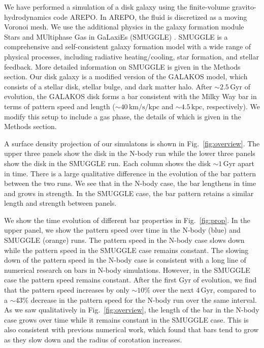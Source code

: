 \documentclass{natureprintstyle}
\begin{document}
We have performed a simulation of a disk galaxy using the finite-volume
gravito-hydrodynamics code AREPO.\cite{2010MNRAS.401..791S} In AREPO, the
fluid is discretized as a moving Voronoi mesh. We use the additional physics
in the galaxy formation module Stars and MUltiphase Gas in GaLaxiEs (SMUGGLE)
\cite{2019MNRAS.489.4233M}. SMUGGLE is a comprehensive and self-consistent
galaxy formation model with a wide range of physical processes, including
radiative heating/cooling, star formation, and stellar feedback. More detailed
information on SMUGGLE is given in the Methods section. Our disk galaxy is a
modified version of the GALAKOS model\cite{2020ApJ...890..117D}, which
consists of a stellar disk, stellar bulge, and dark matter halo. After
$\sim2.5\,\textrm{Gyr}$ of evolution, the GALAKOS disk forms a bar consistent
with the Milky Way bar in terms of pattern speed and length
($\sim40\,\textrm{km}/\textrm{s}/\textrm{kpc}$ and $\sim4.5\,\textrm{kpc}$,
respectively). We modify this setup to include a gas phase, the details of
which is given in the Methods section.

A surface density projection of our simulatons is shown in
Fig.~\ref{fig:overview}. The upper three panels show the disk in the N-body
run while the lower three panels show the disk in the SMUGGLE run. Each column
shows the disk $\sim1\,\textrm{Gyr}$ apart in time. There is a large qualitative
difference in the evolution of the bar pattern between the two runs. We see
that in the N-body case, the bar lengthens in time and grows in strength. In
the SMUGGLE case, the bar pattern retains a similar length and strength
between panels.

We show the time evolution of different bar properties in Fig.~\ref{fig:prop}.
In the upper panel, we show the pattern speed over time in the N-body (blue)
and SMUGGLE (orange) runs. The pattern speed in the N-body case slows down
while the pattern speed in the SMUGGLE case remains constant. The slowing down
of the pattern speed in the N-body case is consistent with a long line of
numerical research on bars in N-body simulations.\cite{1992ApJ...400...80H,
2000ApJ...543..704D, 2002MNRAS.330...35A, 2002ApJ...569L..83A,
2003MNRAS.341.1179A, 2003MNRAS.346..251O, 2005MNRAS.363..991H,
2006ApJ...637..214M, 2007MNRAS.375..460W, 2009ApJ...697..293D} However, in the
SMUGGLE case the pattern speed remains constant. After the first Gyr of
evolution, we find that the pattern speed increases by only $\sim10\%$ over
the next $4\,\textrm{Gyr}$, compared to a $\sim43\%$ decrease in the pattern
speed for the N-body run over the same interval. As we saw qualitatively in
Fig.~\ref{fig:overview}, the length of the bar in the N-body case grows over
time while it remains constant in the SMUGGLE case. This is also consistent
with previous numerical work, which found that bars tend to grow as they slow
down and the radius of corotation increases.\cite{2000ApJ...543..704D,
2003MNRAS.341.1179A}
\end{document}
